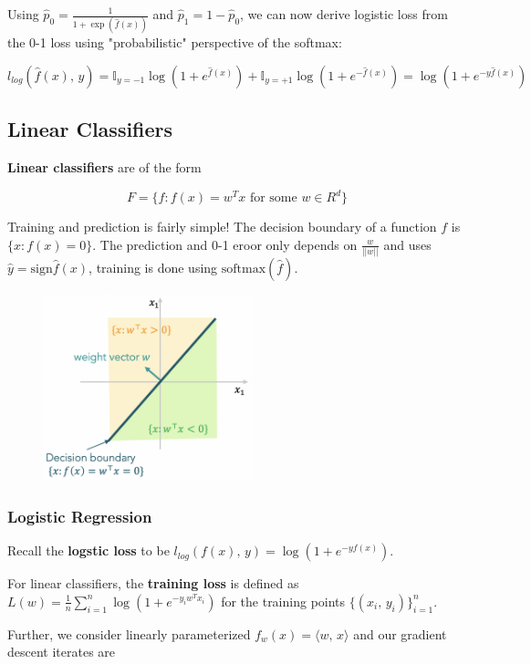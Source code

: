 \documentclass[a4paper]{extarticle}
\begin{document}
Using \(\hat{p}_0 = \frac{1}{1 + \exp(\hat{f}(x))}\) and \(\hat{p}_1 = 1 - \hat{p}_0\), we can now derive logistic loss from the 0-1 loss using "probabilistic" perspective of the softmax:

\[
    l_{log}(\hat{f}(x), \, y) = \mathbb{I}_{y = -1}\log(1 + e^{\hat{f}(x)}) + \mathbb{I}_{y = + 1}\log(1 + e^{- \hat{f}(x)}) = \log(1 + e^{-y\hat{f}(x)})
\]

\subsection{Linear Classifiers}

\textbf{Linear classifiers} are of the form

\[
    F = \{f : f(x) = w^Tx \text{ for some } w \in R^d\}
\]

Training and prediction is fairly simple! The decision boundary of a function \(f\) is \(\{x : f(x) = 0\}\). The prediction and 0-1 eroor only depends on \(\frac{w}{||w||}\) and uses \(\hat{y} = \text{sign} \hat{f}(x)\), training is done using \(\text{softmax}(\hat{f})\).

\begin{figure}[H]
    \includegraphics[width=6cm]{../images/IntroML_Fig4-5}
    \centering
\end{figure}

\subsubsection{Logistic Regression}

Recall the \textbf{logstic loss} to be \(l_{log}(f(x), \, y) = \log (1 + e^{-yf(x)})\).

For linear classifiers, the \textbf{training loss} is defined as \(L(w) = \frac{1}{n}\sum_{i = 1}^n \log(1 + e^{-y_iw^Tx_i})\) for the training points \(\{(x_i, \, y_i)\}_{i = 1}^n\).

Further, we consider linearly parameterized \(f_w(x) = \langle w, \, x \rangle\) and our gradient descent iterates are
\end{document}
